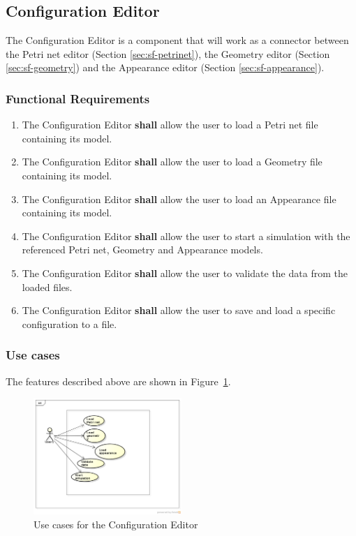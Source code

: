 \subsection{Configuration Editor}

The Configuration Editor is a component that will work as a connector between the Petri net editor (Section \ref{sec:sf-petrinet}), the Geometry editor (Section \ref{sec:sf-geometry}) and the Appearance editor (Section \ref{sec:sf-appearance}). 

\subsubsection{Functional Requirements}

\begin{enumerate}
	\item The Configuration Editor \textbf{shall} allow the user to load a Petri net file containing its model.
	\item The Configuration Editor \textbf{shall} allow the user to load a Geometry file containing its model.
	\item The Configuration Editor \textbf{shall} allow the user to load an Appearance file containing its model.
	\item The Configuration Editor \textbf{shall} allow the user to start a simulation with the referenced Petri net, Geometry and Appearance models.
	\item The Configuration Editor \textbf{shall} allow the user to validate the data from the loaded files.
	\item The Configuration Editor \textbf{shall} allow the user to save and load a specific configuration to a file.
\end{enumerate}

\subsubsection{Use cases}

The features described above are shown in Figure~\ref{fig:use-cases-configuration}.

\begin{figure}[htp]
\begin{center}
  \includegraphics[width=0.5\textwidth]{image/uc-configuration.png}
  \caption{Use cases for the Configuration Editor}
  \label{fig:use-cases-configuration}
\end{center}
\end{figure}